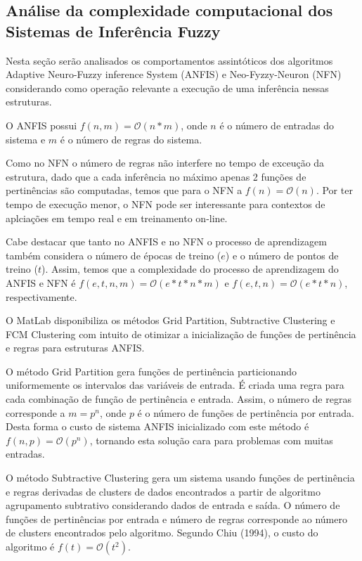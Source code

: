 \documentclass[11pt]{article}
\begin{document}
    \hypertarget{anuxe1lise-da-complexidade-computacional-dos-sistemas-de-inferuxeancia-fuzzy}{%
\subsection{Análise da complexidade computacional dos Sistemas de
Inferência
Fuzzy}\label{anuxe1lise-da-complexidade-computacional-dos-sistemas-de-inferuxeancia-fuzzy}}

Nesta seção serão analisados os comportamentos assintóticos dos
algoritmos Adaptive Neuro-Fuzzy inference System (ANFIS) e
Neo-Fyzzy-Neuron (NFN) considerando como operação relevante a execução
de uma inferência nessas estruturas.

O ANFIS possui \(f(n, m) = \mathcal{O}(n * m)\), onde \(n\) é o número
de entradas do sistema e \(m\) é o número de regras do sistema.

Como no NFN o número de regras não interfere no tempo de exceução da
estrutura, dado que a cada inferência no máximo apenas 2 funções de
pertinências são computadas, temos que para o NFN a
\(f(n) = \mathcal{O}(n)\). Por ter tempo de execução menor, o NFN pode
ser interessante para contextos de aplciações em tempo real e em
treinamento on-line.

Cabe destacar que tanto no ANFIS e no NFN o processo de aprendizagem
também considera o número de épocas de treino (\(e\)) e o número de
pontos de treino (\(t\)). Assim, temos que a complexidade do processo de
aprendizagem do ANFIS e NFN é
\(f(e, t, n, m) = \mathcal{O}(e * t * n * m)\) e
\(f(e, t, n) = \mathcal{O}(e * t * n)\), respectivamente.

O MatLab disponibiliza os métodos Grid Partition, Subtractive Clustering
e FCM Clustering com intuito de otimizar a inicialização de funções de
pertinência e regras para estruturas ANFIS.

O método Grid Partition gera funções de pertinência particionando
uniformemente os intervalos das variáveis de entrada. É criada uma regra
para cada combinação de função de pertinência e entrada. Assim, o número
de regras corresponde a \(m = p^{n}\), onde \(p\) é o número de funções
de pertinência por entrada. Desta forma o custo de sistema ANFIS
inicializado com este método é \(f(n, p) = \mathcal{O}(p^{n})\),
tornando esta solução cara para problemas com muitas entradas.

O método Subtractive Clustering gera um sistema usando funções de
pertinência e regras derivadas de clusters de dados encontrados a partir
de algoritmo agrupamento subtrativo considerando dados de entrada e
saída. O número de funções de pertinências por entrada e número de
regras corresponde ao número de clusters encontrados pelo algoritmo.
Segundo Chiu (1994), o custo do algoritmo é
\(f(t) = \mathcal{O}(t^{2})\).
\end{document}
